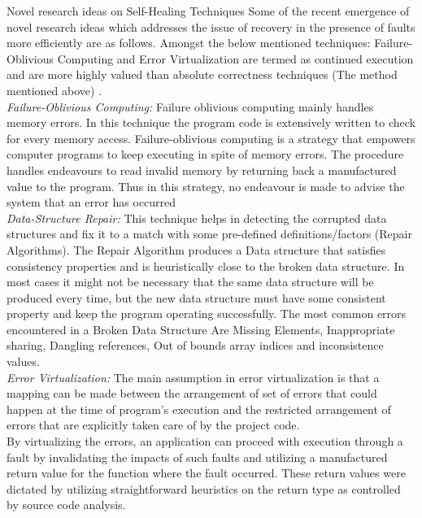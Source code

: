 Novel research ideas on Self-Healing Techniques
Some of the recent emergence of novel research ideas which addresses the issue of recovery in the presence of faults more efficiently are as follows. Amongst the below mentioned techniques: Failure-Oblivious Computing and Error Virtualization are termed as continued execution and are more highly valued than absolute correctness techniques (The method mentioned above)
\cite{Keromytis:SelfHealingSurvey:2011}.\\

\textit{Failure-Oblivious Computing:}
Failure oblivious computing mainly handles memory errors. In this technique the program code is extensively written to check for every memory access.
Failure-oblivious computing is a strategy that empowers computer programs to keep executing in spite of memory errors. The procedure handles endeavours to read invalid memory by returning back a manufactured value to the program. Thus in this strategy, no endeavour is made to advise the system that an error has occurred\\

\textit{Data-Structure Repair: }
This technique helps in detecting the corrupted data structures and fix it to a match with some pre-defined definitions/factors (Repair Algorithms). The Repair Algorithm produces a Data structure that satisfies consistency properties and is heuristically close to the broken data structure. In most cases it might not be necessary that the same data structure will be produced every time, but the new data structure must have some consistent property and keep the program operating successfully. The most common errors encountered in a Broken Data Structure Are Missing Elements, Inappropriate sharing, Dangling references, Out of bounds array indices and inconsistence values.\\
 
\textit{Error Virtualization: }
The main assumption in error virtualization is that a mapping can be made between the arrangement of set of errors that could happen at the time of program's execution and the restricted arrangement of errors that are explicitly taken care of by the project code.\\ 

By virtualizing the errors, an application can proceed with execution through a fault by invalidating the impacts of such faults and utilizing a manufactured return value for the function where the fault occurred. These return values were dictated by utilizing straightforward heuristics on the return type as controlled by source code analysis.\\

